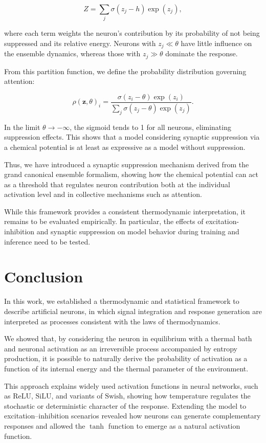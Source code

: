 \documentclass[12pt]{article}
\begin{document}
\begin{equation}
Z = \sum_j \sigma(z_j-h) \exp(z_j),
\end{equation}

where each term weights the neuron’s contribution by its probability of not being suppressed and its relative energy. Neurons with $z_j \ll \theta$ have little influence on the ensemble dynamics, whereas those with $z_j \gg \theta$ dominate the response.

From this partition function, we define the probability distribution governing attention:

\begin{equation}
\rho(\mathbf{z}, \theta)_i =\frac{ \sigma(z_i- \theta) \exp(z_i)}{\sum_j \sigma(z_j-\theta) \exp(z_j)}.
\end{equation}

In the limit $\theta \to -\infty$, the sigmoid tends to 1 for all neurons, eliminating suppression effects. This shows that a model considering synaptic suppression via a chemical potential is at least as expressive as a model without suppression.

Thus, we have introduced a synaptic suppression mechanism derived from the grand canonical ensemble formalism, showing how the chemical potential can act as a threshold that regulates neuron contribution both at the individual activation level and in collective mechanisms such as attention.

While this framework provides a consistent thermodynamic interpretation, it remains to be evaluated empirically. In particular, the effects of excitation-inhibition and synaptic suppression on model behavior during training and inference need to be tested.
\section*{Conclusion}

In this work, we established a thermodynamic and statistical framework to describe artificial neurons, in which signal integration and response generation are interpreted as processes consistent with the laws of thermodynamics.

We showed that, by considering the neuron in equilibrium with a thermal bath and neuronal activation as an irreversible process accompanied by entropy production, it is possible to naturally derive the probability of activation as a function of its internal energy and the thermal parameter of the environment.

This approach explains widely used activation functions in neural networks, such as $\text{ReLU}$, $\text{SiLU}$, and variants of $\text{Swish}$, showing how temperature regulates the stochastic or deterministic character of the response. Extending the model to excitation–inhibition scenarios revealed how neurons can generate complementary responses and allowed the $\tanh$ function to emerge as a natural activation function. 
\end{document}
